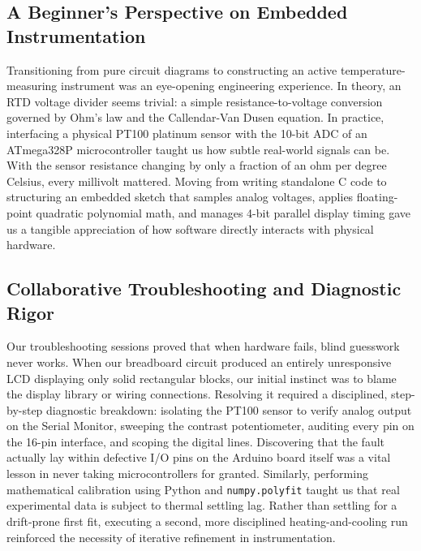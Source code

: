 \documentclass[journal,12pt,onecolumn]{IEEEtran}
\begin{document}
\subsection{A Beginner's Perspective on Embedded Instrumentation}
Transitioning from pure circuit diagrams to constructing an active temperature-measuring instrument was an eye-opening engineering experience. In theory, an RTD voltage divider seems trivial: a simple resistance-to-voltage conversion governed by Ohm's law and the Callendar-Van Dusen equation. In practice, interfacing a physical PT100 platinum sensor with the 10-bit ADC of an ATmega328P microcontroller taught us how subtle real-world signals can be. With the sensor resistance changing by only a fraction of an ohm per degree Celsius, every millivolt mattered. Moving from writing standalone C code to structuring an embedded sketch that samples analog voltages, applies floating-point quadratic polynomial math, and manages 4-bit parallel display timing gave us a tangible appreciation of how software directly interacts with physical hardware.

\subsection{Collaborative Troubleshooting and Diagnostic Rigor}
Our troubleshooting sessions proved that when hardware fails, blind guesswork never works. When our breadboard circuit produced an entirely unresponsive LCD displaying only solid rectangular blocks, our initial instinct was to blame the display library or wiring connections. Resolving it required a disciplined, step-by-step diagnostic breakdown: isolating the PT100 sensor to verify analog output on the Serial Monitor, sweeping the contrast potentiometer, auditing every pin on the 16-pin interface, and scoping the digital lines. Discovering that the fault actually lay within defective I/O pins on the Arduino board itself was a vital lesson in never taking microcontrollers for granted. Similarly, performing mathematical calibration using Python and \texttt{numpy.polyfit} taught us that real experimental data is subject to thermal settling lag. Rather than settling for a drift-prone first fit, executing a second, more disciplined heating-and-cooling run reinforced the necessity of iterative refinement in instrumentation.
\end{document}
